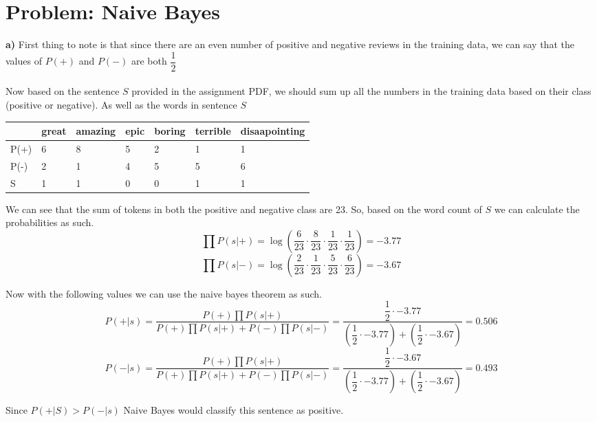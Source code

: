 \documentclass[12pt]{article}
\begin{document}
\section{Problem: Naive Bayes}
\textbf{a)} First thing to note is that since there are an even number of positive and negative reviews in the training data, we can say that the values of $P(+)$ and $P(-)$ are both $\dfrac{1}{2}$\\\\

Now based on the sentence $S$ provided in the assignment PDF, we should sum up all the numbers in the training data based on their class (positive or negative). As well as the words in sentence $S$

\begin{table}[!h]
\centering
\begin{tabular}{|l|l|l|l|l|l|l|}
\hline
     & great & amazing & epic & boring & terrible & disaapointing \\ \hline
P(+) & 6     & 8       & 5    & 2      & 1        & 1             \\ \hline
P(-) & 2     & 1       & 4    & 5      & 5        & 6             \\ \hline
S    & 1     & 1       & 0    & 0      & 1        & 1             \\ \hline
\end{tabular}
\end{table}

We can see that the sum of tokens in both the positive and negative class are 23. So, based on the word count of $S$ we can calculate the probabilities as such.
\[ \prod P(s|+) = \log \left(\dfrac{6}{23} \cdot \dfrac{8}{23} \cdot \dfrac{1}{23} \cdot \dfrac{1}{23}\right) = -3.77 \]
\[ \prod P(s|-) = \log \left(\dfrac{2}{23} \cdot \dfrac{1}{23} \cdot \dfrac{5}{23} \cdot \dfrac{6}{23}\right) = -3.67 \]

Now with the following values we can use the naive bayes theorem as such.
\[P(+|s)=\frac{P(+)\prod P(s|+)}{P(+)\prod P(s|+)+P(-)\prod P(s|-)} = \dfrac{\dfrac{1}{2} \cdot -3.77}{(\dfrac{1}{2} \cdot -3.77) + (\dfrac{1}{2} \cdot -3.67)} = 0.506\]
\[P(-|s)=\frac{P(+)\prod P(s|+)}{P(+)\prod P(s|+)+P(-)\prod P(s|-)} = \dfrac{\dfrac{1}{2} \cdot -3.67}{(\dfrac{1}{2} \cdot -3.77) + (\dfrac{1}{2} \cdot -3.67)} = 0.493\]

Since $P(+|S) > P(-|s)$ Naive Bayes would classify this sentence as positive.\\\\
\end{document}
